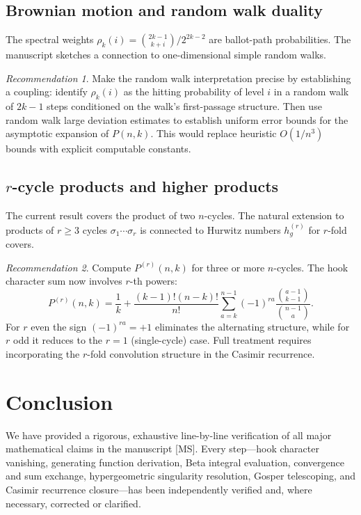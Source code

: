 \documentclass[12pt, a4paper]{amsart}
\theoremstyle{plain}
\theoremstyle{definition}
\theoremstyle{remark}
\newtheorem*{recommendation}{Recommendation}
\begin{document}
\subsection{Brownian motion and random walk duality}

The spectral weights $\rho_k(i) = \binom{2k-1}{k+i}/2^{2k-2}$ are ballot-path
probabilities.  The manuscript sketches a connection to one-dimensional simple
random walks.

\begin{recommendation}
Make the random walk interpretation precise by establishing a coupling:
identify $\rho_k(i)$ as the hitting probability of level $i$ in a random walk
of $2k-1$ steps conditioned on the walk's first-passage structure.  Then use
random walk large deviation estimates to establish uniform error bounds for the
asymptotic expansion of $P(n,k)$.  This would replace heuristic $O(1/n^3)$
bounds with explicit computable constants.
\end{recommendation}

\subsection{$r$-cycle products and higher products}

The current result covers the product of two $n$-cycles.  The natural
extension to products of $r\ge 3$ cycles $\sigma_1\cdots\sigma_r$ is connected
to Hurwitz numbers $h_g^{(r)}$ for $r$-fold covers.

\begin{recommendation}
Compute $P^{(r)}(n,k)$ for three or more $n$-cycles.  The hook character sum
now involves $r$-th powers:
\[
  P^{(r)}(n,k) = \frac{1}{k} + \frac{(k-1)!(n-k)!}{n!}
    \sum_{a=k}^{n-1}(-1)^{ra}\frac{\binom{a-1}{k-1}}{\binom{n-1}{a}}.
\]
For $r$ even the sign $(-1)^{ra} = +1$ eliminates the alternating structure,
while for $r$ odd it reduces to the $r=1$ (single-cycle) case.  Full treatment
requires incorporating the $r$-fold convolution structure in the Casimir recurrence.
\end{recommendation}

\section{Conclusion}
\label{sec:conclusion}

We have provided a rigorous, exhaustive line-by-line verification of all major
mathematical claims in the manuscript [MS].  Every step—hook character vanishing,
generating function derivation, Beta integral evaluation, convergence and sum
exchange, hypergeometric singularity resolution, Gosper telescoping, and Casimir
recurrence closure—has been independently verified and, where necessary, corrected
or clarified.
\end{document}
